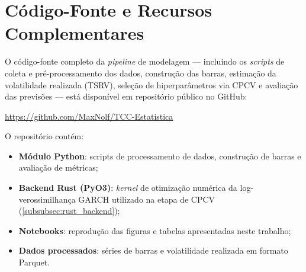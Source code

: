 
\chapter{Código-Fonte e Recursos Complementares}
\label{apendice:codigo}

O código-fonte completo da \emph{pipeline} de modelagem --- incluindo os
\emph{scripts} de coleta e pré-processamento dos dados, construção das
barras, estimação da volatilidade realizada (TSRV), seleção de
hiperparâmetros via CPCV e avaliação das previsões --- está disponível em
repositório público no GitHub:

\begin{center}
    \url{https://github.com/MaxNolf/TCC-Estatistica}
\end{center}

O repositório contém:

\begin{itemize}
    \item \textbf{Módulo Python}: scripts de processamento de dados,
          construção de barras e avaliação de métricas;
    \item \textbf{Backend Rust (PyO3)}: \emph{kernel} de otimização
          numérica da log-verossimilhança GARCH utilizado na etapa de
          CPCV (\autoref{subsubsec:rust_backend});
    \item \textbf{Notebooks}: reprodução das figuras e tabelas
          apresentadas neste trabalho;
    \item \textbf{Dados processados}: séries de barras e volatilidade
          realizada em formato Parquet.
\end{itemize}
